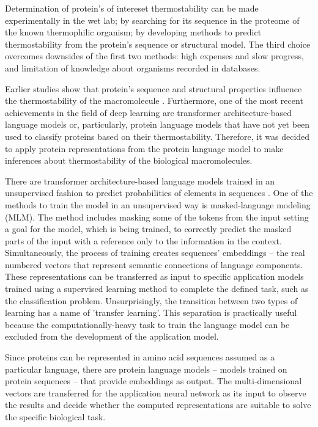 \documentclass[12pt]{article}
\begin{document}
	Determination of protein's of intereset thermostability can be made 
	experimentally in the wet lab; by searching for its sequence in the 
	proteome of the known thermophilic organism; by developing methods to 
	predict thermostability from the protein's sequence or structural 
	model. The third choice overcomes downsides of the first two methods: 
	high expenses and slow progress, and limitation of knowledge about 
	organisms recorded in databases.

	Earlier studies show that protein's sequence and structural properties 
	influence the thermostability of the macromolecule 
	\cite{modarres2016protein}. Furthermore, one of the most recent 
	achievements in the field of deep learning are transformer 
	architecture-based language models or, particularly, protein language 
	models that have not yet been used to classify proteins based on
	their thermostability. Therefore, it was decided to apply protein 
	representations from the protein language model to make inferences about 
	thermostability of the biological macromolecules.

	There are transformer architecture-based language models trained in an 
	unsupervised fashion to predict probabilities of elements in sequences 
	\cite{devlin2018bert}. One of the methods to train the model in an 
	unsupervised way is masked-language modeling (MLM). The method includes 
	masking
	some of the tokens from the input setting a goal for the model, which is 
	being trained, to correctly predict the masked parts of the input with 
	a reference only to the information in the context.
	Simultaneously, the process of training creates sequences' embeddings – the 
	real numbered vectors that represent semantic connections of language 
	components. These representations can be transferred as input to specific 
	application models trained using a supervised learning method to complete 
	the defined task, such as the classification problem. Unsurprisingly, the 
	transition between two types of learning has a name of 'transfer learning'. 
	This separation is practically useful because the computationally-heavy 
	task to train the language model can be excluded from the development of 
	the application model.

	Since proteins can be represented in amino acid sequences assumed as a 
	particular language, there are protein language models – models trained on 
	protein sequences – that provide embeddings as output. The multi-dimensional 
	vectors are transferred for the application neural network as its input to 
	observe the results and decide whether the computed representations are 
	suitable to solve the specific biological task.
\end{document}
